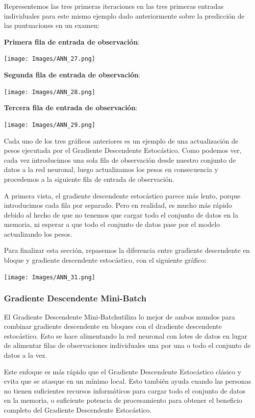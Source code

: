 \documentclass[
]{book}
\begin{document}
Representemos las tres primeras iteraciones en las tres primeras entradas individuales para este mismo ejemplo dado anteriormente sobre la predicción de las puntuaciones en un examen:

\textbf{Primera fila de entrada de observación}:

\texttt{[image: Images/ANN\_27.png]}

\textbf{Segunda fila de entrada de observación}:

\texttt{[image: Images/ANN\_28.png]}

\textbf{Tercera fila de entrada de observación}:

\texttt{[image: Images/ANN\_29.png]}

Cada uno de los tres gráficos anteriores es un ejemplo de una actualización de pesos ejecutada por el Gradiente Descendente Estocástico. Como podemos ver, cada vez introducimos una sola fila de observación desde nuestro conjunto de datos a la red neuronal, luego actualizamos los pesos en consecuencia y procedemos a la siguiente fila de entrada de observación.

A primera vista, el gradiente descendente estocástico parece más lento, porque introducimos cada fila por separado. Pero en realidad, es mucho más rápido debido al hecho de que no tenemos que cargar todo el conjunto de datos en la memoria, ni esperar a que todo el conjunto de datos pase por el modelo actualizando los pesos.

Para finalizar esta sección, repasemos la diferencia entre gradiente descendente en bloque y gradiente descendente estocástico, con el siguiente gráfico:

\texttt{[image: Images/ANN\_31.png]}

\hypertarget{gradiente-descendente-mini-batch}{%
\subsubsection{Gradiente Descendente Mini-Batch}\label{gradiente-descendente-mini-batch}}

El Gradiente Descendente Mini-Batchutiliza lo mejor de ambos mundos para combinar gradiente descendente en bloques con el dradiente descendente estocástico. Esto se hace alimentando la red neuronal con lotes de datos en lugar de alimentar filas de observaciones individuales una por una o todo el conjunto de datos a la vez.

Este enfoque es más rápido que el Gradiente Descendente Estocástico clásico y evita que se atasque en un mínimo local. Esto también ayuda cuando las personas no tienen suficientes recursos informáticos para cargar todo el conjunto de datos en la memoria, o suficiente potencia de procesamiento para obtener el beneficio completo del Gradiente Descendente Estocástico.
\end{document}
